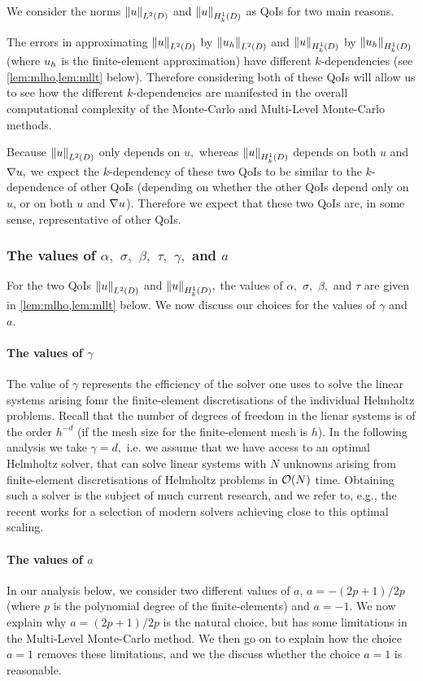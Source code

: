 We consider the norms $\NLtD{u}$ and $\NHokD{u}$ as QoIs for two main reasons.
\ben
\item The errors in approximating $\NLtD{u}$ by $\NLtD{\uh}$ and $\NHokD{u}$ by $\NHokD{\uh}$ (where $u_{h}$ is the finite-element approximation) have different $k$-dependencies (see \cref{lem:mlho,lem:mllt} below). Therefore considering both of these QoIs will allow us to see how the different $k$-dependencies are manifested in the overall computational complexity of the Monte-Carlo and Multi-Level Monte-Carlo methods.
  \item Because $\NLtD{u}$ only depends on $u,$ whereas $\NHokD{u}$ depends on both $u$ and $\nabla u,$ we expect the $k$-dependency of these two QoIs to be similar to the $k$-dependence of other QoIs (depending on whether the other QoIs depend only on $u$, or on both $u$ and $\nabla u$). Therefore we expect that these two QoIs are, in some sense, representative of other QoIs.
\een
\ere

\subsubsection{The values of $\alpha,$ $\sigma,$ $\beta,$ $\tau,$ $\gamma,$ and $a$}
For the two QoIs $\NLtD{u}$ and $\NHokD{u},$ the values of $\alpha,$ $\sigma,$ $\beta,$ and $\tau$ are given in \cref{lem:mlho,lem:mllt} below. We now discuss our choices for the values of $\gamma$ and $a$.

\paragraph{The values of $\gamma$} The value of $\gamma$ represents the efficiency of the solver one uses to solve the linear systems arising fomr the finite-element discretisations of the individual Helmholtz problems. Recall that the number of degrees of freedom in the lienar systems is of the order $h^{-d}$ (if the mesh size for the finite-element mesh is $h$). In the following analysis we take $\gamma = d,$ i.e. we assume that we have access to an optimal Helmholtz solver, that can solve linear systems with $N$ unknowns arising from finite-element discretisations of Helmholtz problems in $\mathcal O(N)$ time. Obtaining such a solver is the subject of much current research, and we refer to, e.g., the recent works \cite{GrSpVa:17,ZeScHeDe:19,TaZeHeDe:19} for a selection of modern solvers achieving close to this optimal scaling.

\paragraph{The values of $a$} In our analysis below, we consider two different values of $a$, $a=-(2p+1)/2p$ (where $p$ is the polynomial degree of the finite-elements) and $a=-1$. We now explain why $a=(2p+1)/2p$ is the natural choice, but has some limitations in the Multi-Level Monte-Carlo method. We then go on to explain how the choice $a=1$ removes these limitations, and we the discuss whether the choice $a=1$ is reasonable.

